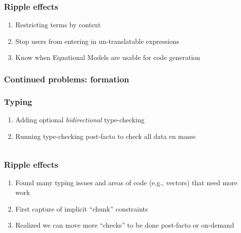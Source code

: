 \documentclass[xcolor={dvipsnames}]{beamer}
\begin{document}
\begin{frame}
  \frametitle{Ripple effects}

  \begin{enumerate}
    \item Restricting terms by context
    \item Stop users from entering in un-translatable expressions
    \item Know when Equational Models are usable for code generation
  \end{enumerate}

\end{frame}

\begin{frame}
  \frametitle{Continued problems: formation}

\end{frame}

\begin{frame}
  \frametitle{Typing}

  \begin{enumerate}
    \item Adding optional \emph{bidirectional} type-checking
    \item Running type-checking post-facto to check all data en masse
  \end{enumerate}

  \begin{columns}
    \begin{column}{0.45\textwidth}
    \end{column}
    \hfill
    \begin{column}{0.45\textwidth}
    \end{column}
  \end{columns}

\end{frame}

\begin{frame}
  \frametitle{Ripple effects}

  \begin{enumerate}
    \item Found many typing issues and areas of code (e.g., vectors) that need
          more work
    \item First capture of implicit ``chunk'' constraints
    \item Realized we can move more ``checks'' to be done post-facto or
          on-demand
  \end{enumerate}

\end{frame}
\end{document}
